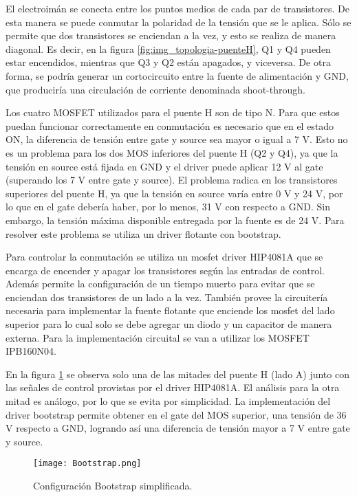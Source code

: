 \noindent El electroimán se conecta entre los puntos medios de cada par de transistores. De esta manera se puede conmutar la polaridad de la tensión que se le aplica. Sólo se permite que dos transistores se enciendan a la vez, y esto se realiza de manera diagonal. Es decir, en la figura \ref{fig:img_topologia-puenteH}, Q1 y Q4 pueden estar encendidos, mientras que Q3 y Q2 están apagados, y viceversa. De otra forma, se podría generar un cortocircuito entre la fuente de alimentación y GND, que produciría una circulación de corriente denominada shoot-through. 


\noindent Los cuatro MOSFET utilizados para el puente H son de tipo N. Para que estos puedan funcionar correctamente en conmutación es necesario que en el estado ON, la diferencia de tensión entre gate y source sea mayor o igual a 7 V. Esto no es un problema para los dos MOS inferiores del puente H (Q2 y Q4), ya que la tensión en source está fijada en GND y el driver puede aplicar 12 V al gate (superando los 7 V entre gate y source). El problema radica en los transistores superiores del puente H, ya que la tensión en source varía entre 0 V y 24 V, por lo que en el gate debería haber, por lo menos, 31 V con respecto a GND. Sin embargo, la tensión máxima disponible entregada por la fuente es de 24 V. Para resolver este problema se utiliza un driver flotante con bootstrap.

\noindent Para controlar la conmutación se utiliza un mosfet driver HIP4081A  que se encarga de encender y apagar los transistores según las entradas de control. Además permite la configuración de un tiempo muerto para evitar que se enciendan dos transistores de un lado a la vez. También provee la circuitería necesaria para implementar la fuente flotante que enciende los mosfet del lado superior para lo cual solo se debe agregar un diodo y un capacitor de manera externa. Para la implementación circuital se van a utilizar los MOSFET IPB160N04.

\noindent En la figura \ref{fig:img_bootstrap} se observa solo una de las mitades del puente H (lado A)  junto con las señales de control provistas por el driver HIP4081A. El análisis para la otra mitad es análogo, por lo que se evita por simplicidad. La implementación del driver bootstrap permite obtener en el gate del MOS superior, una tensión de 36 V respecto a GND, logrando así una diferencia de tensión mayor a 7 V entre gate y source. 

\begin{figure}[H]
	\centering
	\texttt{[image: Bootstrap.png]}
	\caption{Configuración Bootstrap simplificada.}
	\label{fig:img_bootstrap}
\end{figure}

